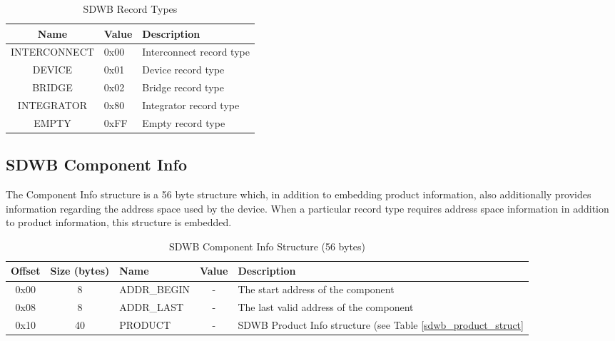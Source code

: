 \documentclass[a4paper, 12pt]{article}
\begin{document}
\begin{description}
\begin{center}
  \begin{savenotes}
    \begin{table}[!ht]\footnotesize
      \caption{SDWB Record Types}\label{record_type}\centering
        \begin{tabular}{| c | l | p{5cm} |} \hline
        Name & Value & Description \\ \hline
        INTERCONNECT & 0x00 & Interconnect record type \\ \hline
        DEVICE & 0x01 & Device record type \\ \hline
        BRIDGE & 0x02 & Bridge record type \\ \hline
        INTEGRATOR & 0x80 & Integrator record type \\ \hline
        EMPTY & 0xFF & Empty record type \\ \hline
        \end{tabular}
    \end{table}
  \end{savenotes}
\end{center}
\end{description}

\subsection{SDWB Component Info}

The Component Info structure is a 56 byte structure which, in addition to embedding product
information, also additionally provides information regarding the address space used by the
device. When a particular record type requires address space information in addition to product
information, this structure is embedded.

\begin{center}
  \begin{savenotes}
    \begin{table}[!ht]\footnotesize
      \caption{SDWB Component Info Structure (56 bytes)}\label{sdwb_component_struct}\centering
        \begin{tabular}{| c | c | l | c | p{5cm} |} \hline
        Offset & Size (bytes) & Name & Value & Description \\ \hline
        0x00 & 8 & ADDR\_BEGIN & - & The start address of the component \\ \hline
        0x08 & 8 & ADDR\_LAST & - & The last valid address of the component \\ \hline
        0x10 & 40 & PRODUCT & - & SDWB Product Info structure (see Table \ref{sdwb_product_struct} \\ \hline
        \end{tabular}
    \end{table}
  \end{savenotes}
\end{center}
\end{document}

